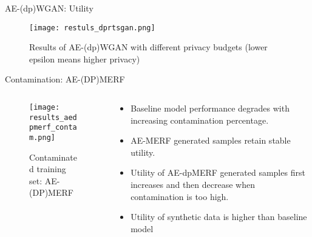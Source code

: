\begin{frame}{AE-(dp)WGAN: Utility}
    \begin{figure}
        \centering
        \texttt{[image: restuls\_dprtsgan.png]}
        \caption{Results of AE-(dp)WGAN with different privacy budgets (lower epsilon means higher privacy)}
        \label{fig:enter-label}
    \end{figure}
\end{frame}

\begin{frame}{Contamination: AE-(DP)MERF}
    \begin{columns}
        \begin{column}{0.65\textwidth}
            \begin{figure}

                \centering
                \texttt{[image: results\_aedpmerf\_contam.png]}
        
                \caption{Contaminated training set: AE-(DP)MERF}
        
            \end{figure}
        \end{column}
        \begin{column}{0.34\textwidth}
            \begin{itemize}
                \scriptsize
                \item \alert{Baseline model} performance degrades with increasing contamination percentage.
                \item \alert{AE-MERF} generated samples retain stable utility.
                \item Utility of \alert{AE-dpMERF} generated samples first increases and then decrease when contamination is too high.
                \item Utility of synthetic data is higher than baseline model    
            \end{itemize}
        \end{column}
    \end{columns}
    
\end{frame}